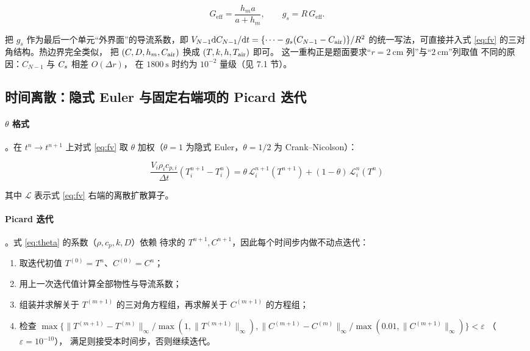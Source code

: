 \begin{equation}
G_{\mathrm{eff}}=\frac{h_m a}{a+h_m},\qquad g_s=R\,G_{\mathrm{eff}} .
\end{equation}

把 $g_s$ 作为最后一个单元“外界面”的导流系数，即
$V_{N-1}\mathrm{d} C_{N-1}/\mathrm{d} t=\{\cdots-g_s(C_{N-1}-C_{\mathrm{air}})\}/R^2$
的统一写法，可直接并入式 \eqref{eq:fv} 的三对角结构。热边界完全类似，
把 $(C,D,h_m,C_{\mathrm{air}})$ 换成 $(T,k,h,T_{\mathrm{air}})$ 即可。
这一重构正是题面要求“$r=2\ \mathrm{cm}$ 列”与“$2\ \mathrm{cm}$”列取值
不同的原因：$C_{N-1}$ 与 $C_{s}$ 相差 $O(\Delta r)$，
在 $1800\ \mathrm{s}$ 时约为 $10^{-2}$ 量级（见 7.1 节）。

\subsection{时间离散：隐式 Euler 与固定右端项的 Picard 迭代}

\paragraph{$\theta$ 格式}。在 $t^n\to t^{n+1}$ 上对式 \eqref{eq:fv} 取
$\theta$ 加权（$\theta=1$ 为隐式 Euler，$\theta=1/2$ 为 Crank--Nicolson）：

\begin{equation}
\frac{V_i\rho_ic_{p,i}}{\Delta t}\left(T_i^{n+1}-T_i^n\right)
=\theta\,\mathcal{L}^{n+1}_i(T^{n+1})+(1-\theta)\,\mathcal{L}^{n}_i(T^{n})
\label{eq:theta}
\end{equation}

其中 $\mathcal{L}$ 表示式 \eqref{eq:fv} 右端的离散扩散算子。

\paragraph{Picard 迭代}。式 \eqref{eq:theta} 的系数（$\rho,c_p,k,D$）依赖
待求的 $T^{n+1},C^{n+1}$，因此每个时间步内做不动点迭代：

\begin{enumerate}[leftmargin=2.4em,itemsep=0.2em]
  \item 取迭代初值 $T^{(0)}=T^n$、$C^{(0)}=C^n$；
  \item 用上一次迭代值计算全部物性与导流系数；
  \item 组装并求解关于 $T^{(m+1)}$ 的三对角方程组，再求解关于 $C^{(m+1)}$ 的方程组；
  \item 检查 $\max\{\|T^{(m+1)}-T^{(m)}\|_\infty/\max(1,\|T^{(m+1)}\|_\infty),
        \|C^{(m+1)}-C^{(m)}\|_\infty/\max(0.01,\|C^{(m+1)}\|_\infty)\}<\varepsilon$
        （$\varepsilon=10^{-10}$），
        满足则接受本时间步，否则继续迭代。
\end{enumerate}

